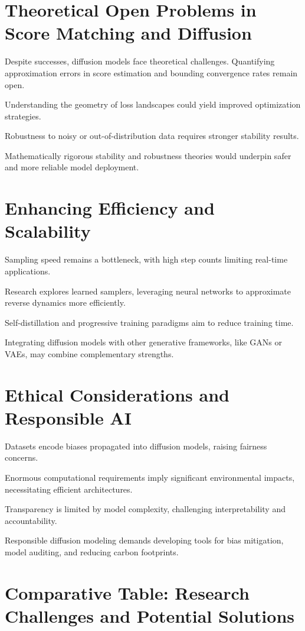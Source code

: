 \documentclass[a4paper,12pt,oneside]{memoir}
\begin{document}
\section{Theoretical Open Problems in Score Matching and Diffusion}

Despite successes, diffusion models face theoretical challenges. Quantifying approximation errors in score estimation and bounding convergence rates remain open.

Understanding the geometry of loss landscapes could yield improved optimization strategies.

Robustness to noisy or out-of-distribution data requires stronger stability results.

Mathematically rigorous stability and robustness theories would underpin safer and more reliable model deployment.

\section{Enhancing Efficiency and Scalability}

Sampling speed remains a bottleneck, with high step counts limiting real-time applications.

Research explores learned samplers, leveraging neural networks to approximate reverse dynamics more efficiently.

Self-distillation and progressive training paradigms aim to reduce training time.

Integrating diffusion models with other generative frameworks, like GANs or VAEs, may combine complementary strengths.

\section{Ethical Considerations and Responsible AI}

Datasets encode biases propagated into diffusion models, raising fairness concerns.

Enormous computational requirements imply significant environmental impacts, necessitating efficient architectures.

Transparency is limited by model complexity, challenging interpretability and accountability.

Responsible diffusion modeling demands developing tools for bias mitigation, model auditing, and reducing carbon footprints.

\section{Comparative Table: Research Challenges and Potential Solutions}
\end{document}

